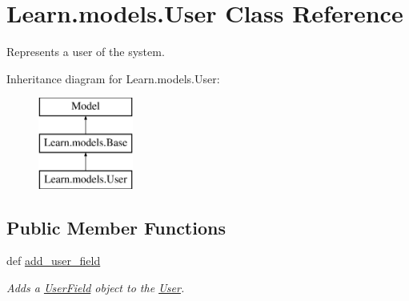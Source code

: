 \hypertarget{class_learn_1_1models_1_1_user}{\section{Learn.\-models.\-User Class Reference}
\label{class_learn_1_1models_1_1_user}
}


Represents a user of the system.  


Inheritance diagram for Learn.\-models.\-User\-:\begin{figure}[H]
\begin{center}
\leavevmode
\includegraphics[height=3.000000cm]{class_learn_1_1models_1_1_user}
\end{center}
\end{figure}
\subsection*{Public Member Functions}
\begin{DoxyCompactItemize}
\item 
def \hyperlink{class_learn_1_1models_1_1_user_aefbdebc82f11edfa6de46493565b3bbc}{add\-\_\-user\-\_\-field}
\begin{DoxyCompactList}\small\item\em Adds a \hyperlink{class_learn_1_1models_1_1_user_field}{User\-Field} object to the \hyperlink{class_learn_1_1models_1_1_user}{User}. \end{DoxyCompactList}\end{DoxyCompactItemize}
